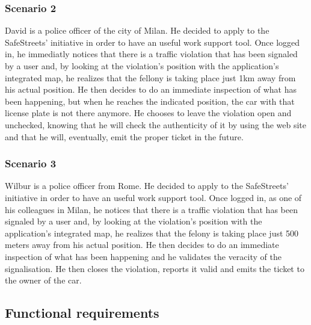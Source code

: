 \documentclass{article}
\begin{document}
\subsubsection{Scenario 2}
David is a police officer of the city of Milan. He decided to apply to the
SafeStreets’ initiative in order to have an useful work support tool. Once
logged in, he immediatly notices that there is a traffic violation that has been
signaled by a user and, by looking at the violation’s position with the
application’s integrated map, he realizes that the fellony is taking place just
1km away from his actual position. He then decides to do an immediate inspection
of what has been happening, but when he reaches the indicated position, the car
with that license plate is not there anymore. He chooses to leave the violation
open and unchecked, knowing that he will check the authenticity of it by using
the web site and that he will, eventually, emit the proper ticket in the future.
\subsubsection{Scenario 3}
Wilbur is a police officer from Rome. He decided to
apply to the SafeStreets’ initiative in order to have an useful work support
tool. Once logged in, as one of his colleagues in Milan, he notices that there
is a traffic violation that has been signaled by a user and, by looking at the
violation’s position with the application’s integrated map, he realizes that the
felony is taking place just 500 meters away from his actual position. He then
decides to do an immediate inspection of what has been happening and he
validates the veracity of the signalisation. He then closes the violation,
reports it valid and emits the ticket to the owner of the car.


\newpage
\subsection{Functional requirements}
\end{document}
